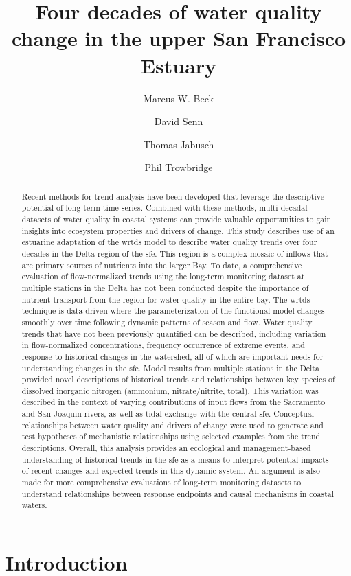 \documentclass[journal = esthag, manuscript = article]{achemso}\usepackage[]{graphicx}\usepackage[]{color}
\author{Marcus W. Beck}
\affiliation{USEPA National Health and Environmental Effects Research Laboratory, Gulf Ecology Division, Gulf Breeze, FL}
\author{David Senn}
\author{Thomas Jabusch}
\author{Phil Trowbridge}
\affiliation{San Francisco Estuary Institute, Richmond, CA}
\title[Water quality change in the upper SFE]{Four decades of water quality change in the upper San Francisco Estuary}
\begin{document}

\begin{abstract}
\noindent Recent methods for trend analysis have been developed that leverage the descriptive potential of long-term time series.  Combined with these methods, multi-decadal datasets of water quality in coastal systems can provide valuable opportunities to gain insights into ecosystem properties and drivers of change.  This study describes use of an estuarine adaptation of the \ac{wrtds} model to describe water quality trends over four decades in the Delta region of the \ac{sfe}. This region is a complex mosaic of inflows that are primary sources of nutrients into the larger Bay.  To date, a comprehensive evaluation of flow-normalized trends using the long-term monitoring dataset at multiple stations in the Delta has not been conducted despite the importance of nutrient transport from the region for water quality in the entire bay.  The \ac{wrtds} technique is data-driven where the parameterization of the functional model changes smoothly over time following dynamic patterns of season and flow.  Water quality trends that have not been previously quantified can be described, including variation in flow-normalized concentrations, frequency occurrence of extreme events, and response to historical changes in the watershed, all of which are important needs for understanding changes in the \ac{sfe}.  Model results from multiple stations in the Delta provided novel descriptions of historical trends and relationships between key species of dissolved inorganic nitrogen (ammonium, nitrate/nitrite, total).  This variation was described in the context of varying contributions of input flows from the Sacramento and San Joaquin rivers, as well as tidal exchange with the central \ac{sfe}.  Conceptual relationships between water quality and drivers of change were used to generate and test hypotheses of mechanistic relationships using selected examples from the trend descriptions. Overall, this analysis provides an ecological and management-based understanding of historical trends in the \ac{sfe} as a means to interpret potential impacts of recent changes and expected trends in this dynamic system.  An argument is also made for more comprehensive evaluations of long-term monitoring datasets to understand relationships between response endpoints and causal mechanisms in coastal waters.
\end{abstract}
\acresetall

\section{Introduction}
\end{document}
